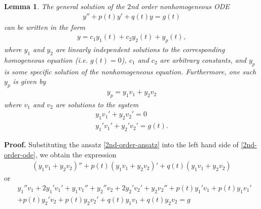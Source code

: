 \documentclass[12pt,reqno]{amsart}
\numberwithin{equation}{section}  %
\numberwithin{figure}{section}
\theoremstyle{plain}
\newtheorem{lemma}{Lemma}
\theoremstyle{definition}
\theoremstyle{remark}
\begin{document}
\begin{lemma}
\label{lem:nonhomog-ode-soln}
The general solution of the $2$nd order nonhomogeneous ODE 
%
%
\begin{equation}
  \label{2nd-order-ode}
\begin{split}
y'' + p(t)y' + q(t)y = g(t)
\end{split}
\end{equation}
%
%
can be written in the form
%
%
\begin{equation*}
\begin{split}
  y = c_{1}y_{1}(t) + c_{2}y_{2}(t) + y_{p}(t),
\end{split}
\end{equation*}
%
%
where $y_{1}$ and $y_{2}$ are linearly independent solutions to the
corresponding homogeneous equation (i.e. $g(t) = 0$), $c_{1}$ and $c_{2}$ are
arbitrary constants, and $y_{p}$ is some specific solution of the nonhomogeneous
equation. Furthermore, one such $y_{p}$ is given by
%
%
\begin{equation}
  \label{2nd-order-ansatz}
\begin{split}
  y_{p} = y_{1}v_{1} + y_{2} v_{2}
\end{split}
\end{equation}
%
%
where $v_{1}$ and $v_{2}$ are solutions to the system
\begin{gather}
  \label{cancel-rel-1}
  y_{1} v_{1}' + y_{2} v_{2}' = 0
  \\
  \label{cancel-rel-2}
  y_{1}' v_{1}' + y_{2}' v_{2}' = g(t).
\end{gather}
\end{lemma}
%
{\bf Proof.} Substituting the ansatz \eqref{2nd-order-ansatz} into
the left hand side of \eqref{2nd-order-ode}, we obtain the expression
%
%
%
%
\begin{equation*}
\begin{split}
  (y_{1}v_{1} + y_{2}v_{2})'' + p(t)(y_{1}v_{1} + y_{2}v_{2})' +
  q(t)(y_{1}v_{1} + y_{2}v_{2}) 
\end{split}
\end{equation*}
%
%
or
%
%
\begin{equation*}
  \begin{split}
    & y_{1}'' v_{1} + 2y_{1}'v_{1}' + y_{1}v_{1}'' + y_{2}''v_{2} + 2y_{2}' v_{2}'
  + y_{2} v_{2}'' + p(t)y_{1}'v_{1} + p(t)y_{1}v_{1}'
  \\
  & + p(t)y_{2}'v_{2} + p(t)y_{2}v_{2}' + q(t)y_{1}v_{1} + q(t)y_{2}v_{2} =g
\end{split}
\end{equation*}
\end{document}
